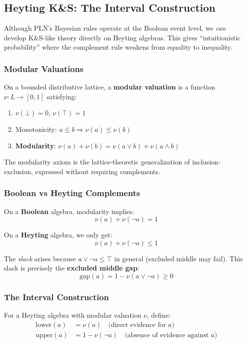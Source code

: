 \documentclass[]{article}
\begin{document}
\subsection{Heyting K\&S: The Interval Construction}
\label{sec:heytingks}

Although PLN's Bayesian rules operate at the Boolean event level, we
\emph{can} develop K\&S-like theory directly on Heyting algebras.  This
gives ``intuitionistic probability'' where the complement rule weakens
from equality to inequality.

\subsubsection{Modular Valuations}

On a bounded distributive lattice, a \textbf{modular valuation} is a
function $\nu: L \to [0,1]$ satisfying:
\begin{enumerate}
\item $\nu(\bot) = 0$, $\nu(\top) = 1$
\item Monotonicity: $a \leq b \Rightarrow \nu(a) \leq \nu(b)$
\item \textbf{Modularity}: $\nu(a) + \nu(b) = \nu(a \vee b) + \nu(a \wedge b)$
\end{enumerate}

The modularity axiom is the lattice-theoretic generalization of
inclusion-exclusion, expressed without requiring complements.

\subsubsection{Boolean vs Heyting Complements}

On a \textbf{Boolean} algebra, modularity implies:
$$\nu(a) + \nu(\neg a) = 1$$

On a \textbf{Heyting} algebra, we only get:
$$\nu(a) + \nu(\neg a) \leq 1$$

The \emph{slack} arises because $a \vee \neg a \leq \top$ in general
(excluded middle may fail).  This slack is precisely the
\textbf{excluded middle gap}:
$$\text{gap}(a) = 1 - \nu(a \vee \neg a) \geq 0$$

\subsubsection{The Interval Construction}

For a Heyting algebra with modular valuation $\nu$, define:
\begin{align*}
\text{lower}(a) &= \nu(a) \quad \text{(direct evidence for $a$)} \\
\text{upper}(a) &= 1 - \nu(\neg a) \quad \text{(absence of evidence against $a$)}
\end{align*}
\end{document}
